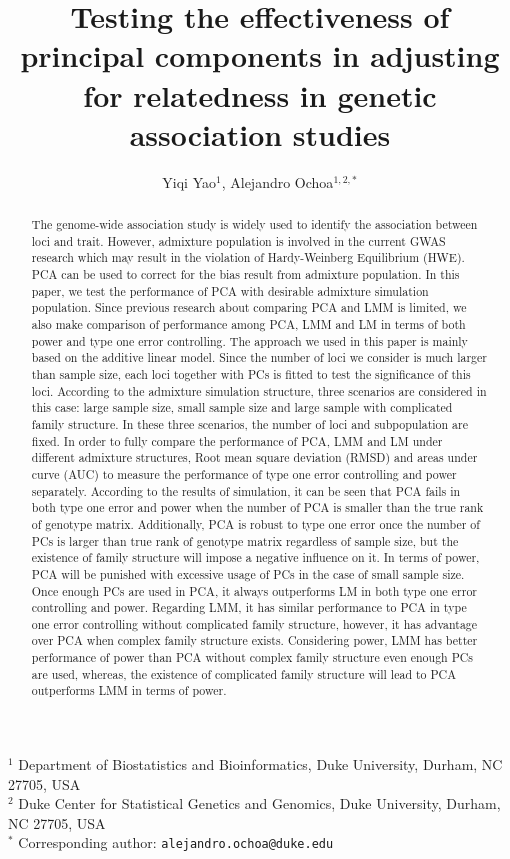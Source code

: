 \documentclass[11pt]{article}
\title{\Large \textbf{Testing the effectiveness of principal components in adjusting for relatedness in genetic association studies}}
\author{Yiqi Yao$^1$, Alejandro Ochoa$^{1,2,*}$}
\date{}
\begin{document}
\maketitle

\noindent
$^1$ Department of Biostatistics and Bioinformatics, Duke University, Durham, NC 27705, USA \\
$^2$ Duke Center for Statistical Genetics and Genomics, Duke University, Durham, NC 27705, USA \\
$^*$ Corresponding author: \texttt{alejandro.ochoa@duke.edu}


\begin{abstract}
  The genome-wide association study is widely used to identify the association between loci and trait.
  However, admixture population is involved in the current GWAS research which may result in the violation of Hardy-Weinberg Equilibrium (HWE).
  PCA can be used to correct for the bias result from admixture population.
  In this paper, we test the performance of PCA with desirable admixture simulation population.
  Since previous research about comparing PCA and LMM is limited, we also make comparison of performance among PCA, LMM and LM in terms of both power and type one error controlling.
  The approach we used in this paper is mainly based on the additive linear model.
  Since the number of loci we consider is much larger than sample size, each loci together with PCs is fitted to test the significance of this loci.
  According to the admixture simulation structure, three scenarios are considered in this case: large sample size, small sample size and large sample with complicated family structure.
  In these three scenarios, the number of loci and subpopulation are fixed.
  In order to fully compare the performance of PCA, LMM and LM under different admixture structures, Root mean square deviation (RMSD) and areas under curve (AUC) to measure the performance of type one error controlling and power separately.
  According to the results of simulation, it can be seen that PCA fails in both type one error and power when the number of PCA is smaller than the true rank of genotype matrix.
  Additionally, PCA is robust to type one error once the number of PCs is larger than true rank of genotype matrix regardless of sample size, but the existence of family structure will impose a negative influence on it.
  In terms of power, PCA will be punished with excessive usage of PCs in the case of small sample size.
  Once enough PCs are used in PCA, it always outperforms LM in both type one error controlling and power.
  Regarding LMM, it has similar performance to PCA in type one error controlling without complicated family structure, however, it has advantage over PCA when complex family structure exists.
  Considering power, LMM has better performance of power than PCA without complex family structure even enough PCs are used, whereas, the existence of complicated family structure will lead to PCA outperforms LMM in terms of power. 
\end{abstract}
\end{document}
